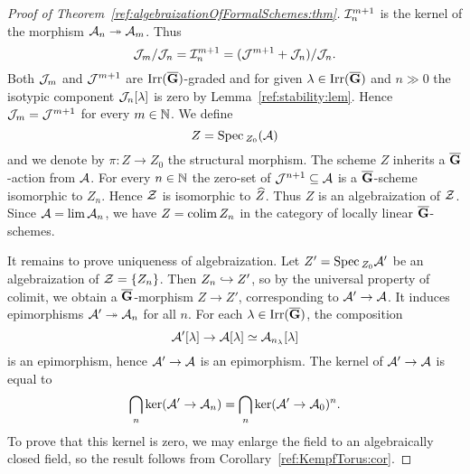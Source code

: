 \begin{proof}[Proof of Theorem~\ref{ref:algebraizationOfFormalSchemes:thm}]
${\mathcal I}_n^{m+1}$ is the kernel of the morphism ${\mathcal A}_n\twoheadrightarrow {\mathcal A}_m$.
Thus
\[
{\mathcal J}_m/{\mathcal J}_n={\mathcal I}_n^{m+1}=({\mathcal J}^{m+1}+{\mathcal J}_n)/{\mathcal J}_n.
\]
Both ${\mathcal J}_m$ and ${\mathcal J}^{m+1}$ are $\operatorname{Irr}(\overline{\mathbf{G}})$-graded and for given
$\lambda\in \operatorname{Irr}(\overline{\mathbf{G}})$ and $n\gg 0$ the isotypic component
${\mathcal J}_n[\lambda]$ is zero by Lemma~\ref{ref:stability:lem}. Hence ${\mathcal J}_m={\mathcal J}^{m+1}$ for every $m \in {\mathbb N}$.
We define
\[
    Z=\mathrm{Spec}\,_{Z_0}({\mathcal A})
\]
and we denote by $\pi:Z\to Z_0$ the structural morphism. The scheme $Z$
inherits a $\overline{\mathbf{G}}$-action from ${\mathcal A}$. For
every $n\in {\mathbb N}$ the zero-set of ${\mathcal J}^{n+1}\subseteq {\mathcal A}$ is a $\overline{\mathbf{G}}$-scheme
isomorphic to $Z_n$. Hence ${\mathcal Z}$ is isomorphic to $\widehat{Z}$.
Thus $Z$ is an algebraization of ${\mathcal Z}$. Since ${\mathcal A}=\lim {\mathcal A}_n$, we
have $Z = \operatorname{colim} Z_n$ in the category of locally linear $\overline{\mathbf{G}}$-schemes.

It remains to prove uniqueness of algebraization. Let $Z' = \mathrm{Spec}\,_{Z_0} {\mathcal A}'$
be an algebraization of ${\mathcal Z} = \{Z_n\}$. Then $Z_n \hookrightarrow Z'$, so by the
universal property of colimit, we obtain a $\overline{\mathbf{G}}$-morphism $Z\to Z'$,
corresponding to ${\mathcal A}' \to {\mathcal A}$. It induces epimorphisms ${\mathcal A}' \twoheadrightarrow {\mathcal A}_n$
for all $n$. For each $\lambda\in \operatorname{Irr}(\overline{\mathbf{G}})$, the composition
\[
    {\mathcal A}'[\lambda]\to {\mathcal A}[\lambda]  \simeq {\mathcal A}_{n_\lambda}[\lambda]
\]
is an epimorphism, hence ${\mathcal A}'\to {\mathcal A}$ is an epimorphism. The kernel of
${\mathcal A}'\to {\mathcal A}$ is equal to
\[
    \bigcap_n \ker({\mathcal A}'\to {\mathcal A}_n) = \bigcap_n \ker({\mathcal A}' \to {\mathcal A}_0)^n.
\]
To prove that this kernel is zero, we may enlarge the field to an
algebraically closed field, so the result follows from
Corollary~\ref{ref:KempfTorus:cor}.


\end{proof}
